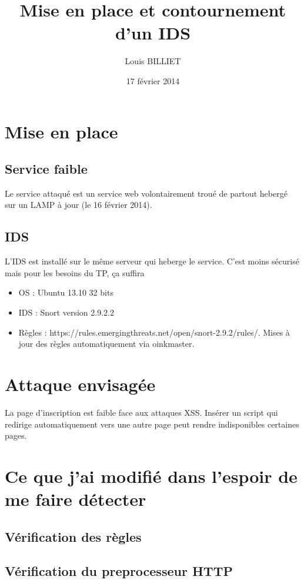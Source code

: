 \documentclass[oneside,10pt]{article}
\begin{document}
\title{Mise en place et contournement d'un IDS}
\author{Louis BILLIET}
\date{17 f\'evrier 2014}
\maketitle

\section{Mise en place}
\subsection{Service faible}
Le service attaqu\'e est un service web volontairement trou\'e de partout heberg\'e sur un LAMP \`a jour (le 16 f\'evrier 2014).

\subsection{IDS}
L'IDS est install\'e sur le m\^eme serveur qui heberge le service.
C'est moins s\'ecuris\'e mais pour les besoins du TP, \c ca suffira
\begin{itemize}
\item OS : Ubuntu 13.10 32 bits
\item IDS : Snort version 2.9.2.2
\item R\`egles : https://rules.emergingthreats.net/open/snort-2.9.2/rules/.
Mises \`a jour des r\`egles automatiquement via oinkmaster.
\end{itemize}

\section{Attaque envisag\'ee}
La page d'inscription est faible face aux attaques XSS.
Ins\'erer un script qui redirige automatiquement vers une autre page peut rendre indisponibles certaines pages.

\section{Ce que j'ai modifi\'e dans l'espoir de me faire d\'etecter}
\subsection{V\'erification des r\`egles}
\subsection{V\'erification du preprocesseur HTTP}
\end{document}
